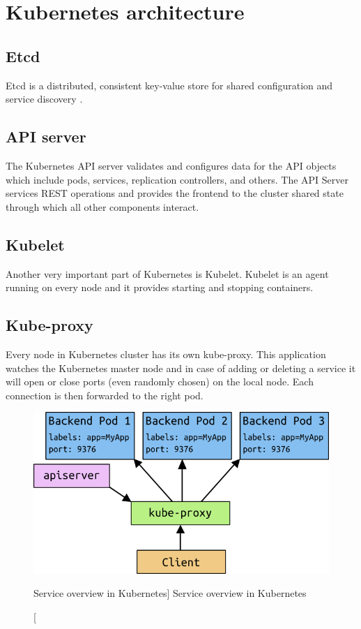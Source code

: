 \chapter{Kubernetes architecture}

\section{Etcd}
Etcd is a distributed, consistent key-value store for shared configuration and service discovery \cite{etcd}.	

\section{API server}
The Kubernetes API server validates and configures data for the API objects which include pods, services, replication controllers, and others. The API Server services REST operations and provides the frontend to the cluster shared state through which all other components interact. \cite{kubernetesdoc}

\section{Kubelet}
Another very important part of Kubernetes is Kubelet. Kubelet is an agent running on every node and it provides starting and stopping containers.

\section{Kube-proxy}
Every node in Kubernetes cluster has its own kube-proxy. This application watches the Kubernetes master node and in case of adding or deleting a service it will open or close ports (even randomly chosen) on the local node. Each connection is then forwarded to the right pod.

\begin{figure}[htb]\centering
  \includegraphics[width=1\textwidth]{images/services-overview.png}
  \caption
    [Service overview in Kubernetes]
    {Service overview in Kubernetes \cite{kubernetesdoc}}
  \label{fig:services-overview}
\end{figure}

